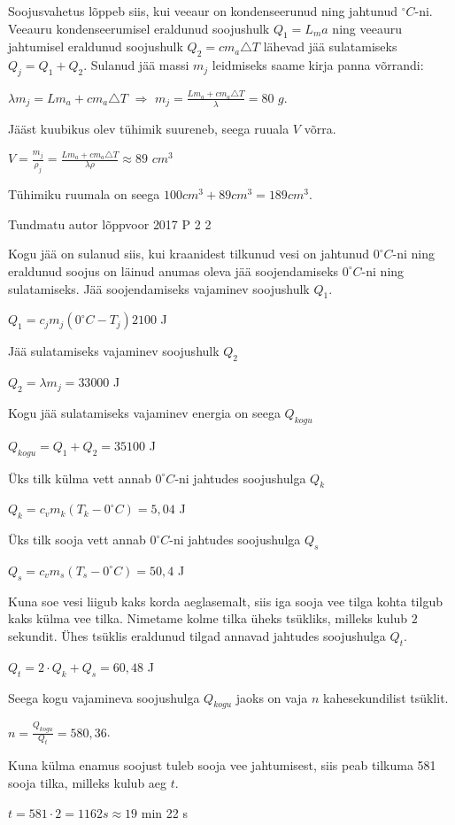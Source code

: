 \documentclass[11pt]{article}
\begin{document}
{{\ifSolution
Soojusvahetus lõppeb siis, kui veeaur on kondenseerunud ning jahtunud $^{\circ}C$-ni. Veeauru kondenseerumisel eraldunud soojushulk $Q_1 = L_m a$ ning veeauru jahtumisel eraldunud soojushulk $Q_2 = cm_a \triangle T$ lähevad jää sulatamiseks $Q_j = Q_1 + Q_2$. Sulanud jää massi $m_j$ leidmiseks saame kirja panna võrrandi:
\begin{center}
$\lambda m_j = Lm_a + cm_a \triangle T$ $\Rightarrow$ $m_j = \frac{Lm_a + cm_a \triangle T}{\lambda} = 80$ $g$.
\end{center}
Jääst kuubikus olev tühimik suureneb, seega ruuala $V$ võrra. 
\begin{center}
$V = \frac{m_j}{\rho_j} = \frac{Lm_a + cm_a \triangle T}{\lambda \rho} \approx 89$ $cm^3$
\end{center}
Tühimiku ruumala on seega $100 cm^3 + 89 cm^3 = 189 cm^3$.
\fi
}

{Tundmatu autor} %
{lõppvoor} %
{2017} %
{P 2} %
{2} %
{

\ifSolution
Kogu jää on sulanud siis, kui kraanidest tilkunud vesi on jahtunud $0 ^{\circ}C$-ni ning eraldunud soojus on läinud anumas oleva jää soojendamiseks $0 ^{\circ}C$-ni ning sulatamiseks.
Jää soojendamiseks vajaminev soojushulk $Q_1$.
\begin{center}
$Q_1 = c_j m_j (0 ^{\circ}C - T_j)2100$ J
\end{center}
Jää sulatamiseks vajaminev soojushulk $Q_2$
\begin{center}
$Q_2 = \lambda m_j = 33 000$ J
\end{center}
Kogu jää sulatamiseks vajaminev energia on seega $Q_{kogu}$
\begin{center}
$Q_{kogu} = Q_1 + Q_2 = 35 100$ J
\end{center}
Üks tilk külma vett annab $0 ^{\circ}C$-ni jahtudes soojushulga $Q_k$
\begin{center}
$Q_k = c_v m_k (T_k - 0 ^{\circ}C) = 5,04$ J
\end{center}
Üks tilk sooja vett annab $0 ^{\circ}C$-ni jahtudes soojushulga $Q_s$
\begin{center}
$Q_s = c_v m_s(T_s - 0 ^{\circ}C) = 50,4$ J
\end{center}
Kuna soe vesi liigub kaks korda aeglasemalt, siis iga sooja vee tilga kohta tilgub kaks külma vee tilka. Nimetame kolme tilka üheks tsükliks, milleks kulub $2$ sekundit. Ühes tsüklis eraldunud tilgad annavad jahtudes soojushulga $Q_t$.
\begin{center}
$Q_t = 2 \cdot Q_k + Q_s = 60,48$ J
\end{center}
Seega kogu vajamineva soojushulga $Q_{kogu}$ jaoks on vaja $n$ kahesekundilist tsüklit.
\begin{center}
$n = \frac{Q_{kogu}}{Q_t} = 580,36$.
\end{center}
Kuna külma enamus soojust tuleb sooja vee jahtumisest, siis peab tilkuma 581 sooja tilka, milleks kulub aeg $t$.
\begin{center}
$t = 581 \cdot 2 = 1162 s \approx 19$ min 22 s
\end{center}
\fi
}

}
\end{document}
